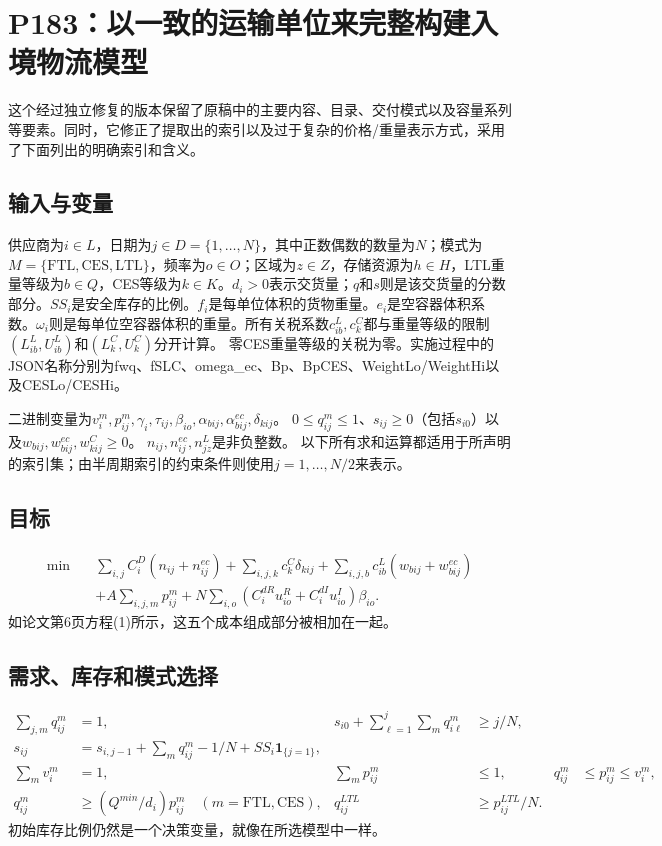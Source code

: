 \documentclass{article}
\begin{document}
\section*{P183：以一致的运输单位来完整构建入境物流模型}
这个经过独立修复的版本保留了原稿中的主要内容、目录、交付模式以及容量系列等要素。同时，它修正了提取出的索引以及过于复杂的价格/重量表示方式，采用了下面列出的明确索引和含义。

\subsection*{输入与变量}
供应商为$i\in L$，日期为$j\in D=\{1,\ldots,N\}$，其中正数偶数的数量为$N$；模式为$M=\{\mathrm{FTL},\mathrm{CES},\mathrm{LTL}\}$，频率为$o\in O$；区域为$z\in Z$，存储资源为$h\in H$，LTL重量等级为$b\in Q$，CES等级为$k\in K$。$d_i>0$表示交货量；$q$和$s$则是该交货量的分数部分。$SS_i$是安全库存的比例。$f_i$是每单位体积的货物重量。$e_i$是空容器体积系数。$\omega_i$则是每单位空容器体积的重量。所有关税系数$c^L_{ib},c^C_k$都与重量等级的限制$(L^L_{ib},U^L_{ib})$和$(L^C_k,U^C_k)$分开计算。
零CES重量等级的关税为零。实施过程中的JSON名称分别为fwq、fSLC、omega\_ec、Bp、BpCES、WeightLo/WeightHi以及CESLo/CESHi。

二进制变量为$v_i^m,p_{ij}^m,\gamma_i,\tau_{ij},\beta_{io},
\alpha_{bij},\alpha^{ec}_{bij},\delta_{kij}$。  
$0\le q_{ij}^m\le1$、$s_{ij}\ge0$（包括$s_{i0}$）以及$w_{bij},w^{ec}_{bij},w^C_{kij}\ge0$。  
$n_{ij},n^{ec}_{ij},n^L_{jz}$是非负整数。  
以下所有求和运算都适用于所声明的索引集；由半周期索引的约束条件则使用$j=1,\ldots,N/2$来表示。

\subsection*{目标}
\begin{align}
\min\quad&
\sum_{i,j}C_i^D(n_{ij}+n^{ec}_{ij})
+\sum_{i,j,k}c_k^C\delta_{kij}
+\sum_{i,j,b}c^L_{ib}(w_{bij}+w^{ec}_{bij})\\
&+A\sum_{i,j,m}p_{ij}^m
+N\sum_{i,o}(C_i^{dR}u_{io}^R+C_i^{dI}u_{io}^I)\beta_{io}.
\end{align}
如论文第6页方程(1)所示，这五个成本组成部分被相加在一起。
\subsection*{需求、库存和模式选择}
\begin{align}
\sum_{j,m}q_{ij}^m&=1,&
s_{i0}+\sum_{\ell=1}^j\sum_mq_{i\ell}^m&\ge j/N,\\
s_{ij}&=s_{i,j-1}+\sum_mq_{ij}^m-1/N+SS_i\mathbf1_{\{j=1\}},\\
\sum_m v_i^m&=1,&
\sum_m p_{ij}^m&\le1,&
q_{ij}^m&\le p_{ij}^m\le v_i^m,\\
q_{ij}^m&\ge(Q^{min}/d_i)p_{ij}^m\quad(m=\mathrm{FTL},\mathrm{CES}),&
q_{ij}^{LTL}&\ge p_{ij}^{LTL}/N.
\end{align}
初始库存比例仍然是一个决策变量，就像在所选模型中一样。
\end{document}

